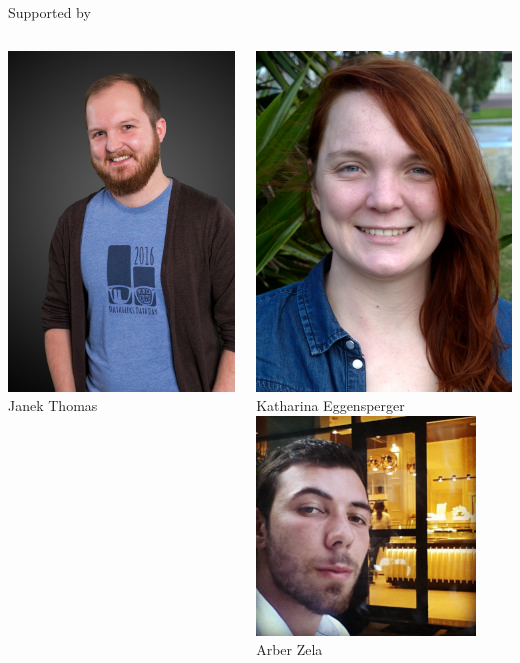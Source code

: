 \begin{frame}[c]{Supported by}
\begin{columns}
	\includegraphics[width=.3\textwidth]{images/thomas.jpg}\\
	Janek Thomas
	
		\centering
		\includegraphics[width=.3\textwidth]{images/eggensperger_small.jpg}\\
	Katharina Eggensperger\\[1.em]
	
	\includegraphics[width=.3\textwidth]{images/arber_small.jpg}\\
    Arber Zela
	
\end{columns}


\end{frame}


